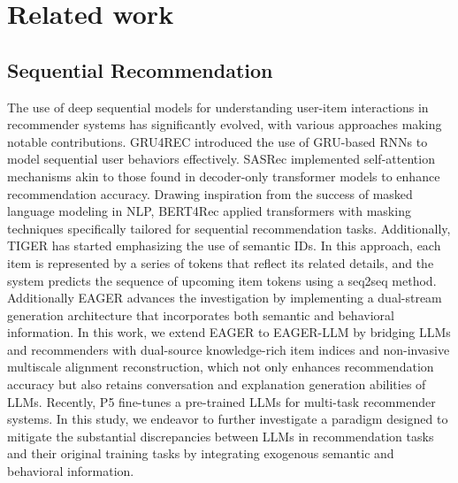 \section{Related work}
\subsection{Sequential Recommendation}
The use of deep sequential models for understanding user-item interactions in recommender systems has significantly evolved, with various approaches making notable contributions. GRU4REC \cite{hidasi2015gru4rec} introduced the use of GRU-based RNNs to model sequential user behaviors effectively. SASRec \cite{kang2018sasrec} implemented self-attention mechanisms akin to those found in decoder-only transformer models to enhance recommendation accuracy. Drawing inspiration from the success of masked language modeling in NLP, BERT4Rec \cite{sun2019bert4rec} applied transformers with masking techniques specifically tailored for sequential recommendation tasks. Additionally, TIGER \cite{rajput2024tiger} has started emphasizing the use of semantic IDs. In this approach, each item is represented by a series of tokens that reflect its related details, and the system predicts the sequence of upcoming item tokens using a seq2seq method. Additionally EAGER \cite{wang2024eager} advances the investigation by implementing a dual-stream generation architecture that incorporates both semantic and behavioral information. In this work, we extend EAGER \cite{wang2024eager} to EAGER-LLM by bridging LLMs and recommenders with dual-source knowledge-rich item indices and non-invasive multiscale alignment reconstruction, which not only enhances recommendation accuracy but also retains conversation and explanation generation abilities of LLMs. Recently, P5 \cite{geng2022p5, hua2023p5_cid} fine-tunes a pre-trained LLMs for multi-task recommender systems. In this study, we endeavor to further investigate a paradigm designed to mitigate the substantial discrepancies between LLMs in recommendation tasks and their original training tasks by integrating exogenous semantic and behavioral information.

